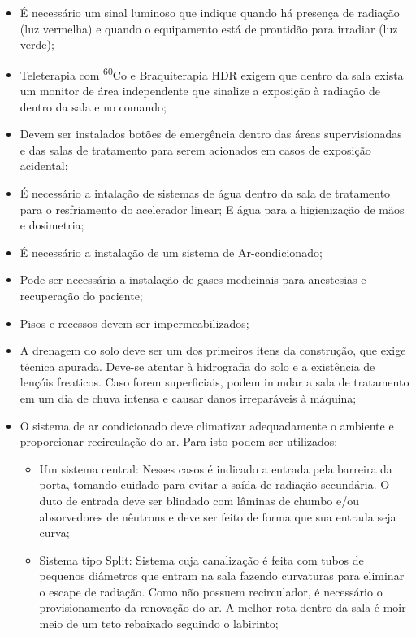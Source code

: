 \documentclass[11pt,a4paper]{article}
\begin{document}
\begin{itemize}
            \item É necessário um sinal luminoso que indique quando há presença de radiação (luz vermelha) e quando o equipamento está de prontidão para irradiar (luz verde);
            \item Teleterapia com \textsuperscript{60}Co e Braquiterapia HDR exigem que dentro da sala exista um monitor de área independente que sinalize a exposição à radiação de dentro da sala e no comando;
            \item Devem ser instalados botões de emergência dentro das áreas supervisionadas e das salas de tratamento para serem acionados em casos de exposição acidental;
            \item É necessário a intalação de sistemas de água dentro da sala de tratamento para o resfriamento do acelerador linear; E água para a higienização de mãos e dosimetria;
            \item É necessário a instalação de um sistema de Ar-condicionado;
            \item Pode ser necessária a instalação de gases medicinais para anestesias e recuperação do paciente;
            \item Pisos e recessos devem ser impermeabilizados;
            \item A drenagem do solo deve ser um dos primeiros itens da construção, que exige técnica apurada. Deve-se atentar à hidrografia do solo e a existência de lençóis freaticos. Caso forem superficiais, podem inundar a sala de tratamento em um dia de chuva intensa e causar danos irreparáveis à máquina;
            \item O sistema de ar condicionado deve climatizar adequadamente o ambiente e proporcionar recirculação do ar. Para isto podem ser utilizados:
                \begin{itemize}
                    \item Um sistema central: Nesses casos é indicado a entrada pela barreira da porta, tomando cuidado para evitar a saída de radiação secundária. O duto de entrada deve ser blindado com lâminas de chumbo e/ou absorvedores de nêutrons e deve ser feito de forma que sua entrada seja curva;
                    \item Sistema tipo Split: Sistema cuja canalização é feita com tubos de pequenos diâmetros que entram na sala fazendo curvaturas para eliminar o escape de radiação. Como não possuem recirculador, é necessário o provisionamento da renovação do ar. A melhor rota dentro da sala é moir meio de um teto rebaixado seguindo o labirinto;
                    


\end{itemize}
\end{itemize}
\end{document}
